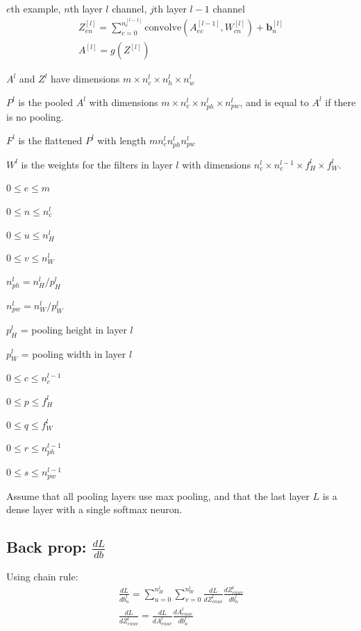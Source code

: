 \documentclass[12pt]{article}
\begin{document}
$e$th example, $n$th layer $l$ channel, $j$th layer $l-1$ channel
\begin{gather*}
    Z^{[l]}_{en} = \sum_{c=0}^{n_c^{[l-1]}}\text{convolve}(A^{[l-1]}_{ec},W^{[l]}_{cn}) + \bm b^{[l]}_n\\
    A^{[l]} = g(Z^{[l]})
\end{gather*}

$A^l$ and $Z^l$ have dimensions $m \times n_c^l \times n_h^l \times n_w^l$

$P^l$ is the pooled $A^l$ with dimensions $m \times n_c^l \times n^l_{ph} \times n^l_{pw}$,
and is equal to $A^l$ if there is no pooling.

$F^l$ is the flattened $P^l$ with length $m n_c^l n_{ph}^l n_{pw}^l$

$W^l$ is the weights for the filters in layer $l$ with dimensions $n_c^l \times n_c^{l-1}
\times f_H^l \times f_W^l$.

$0 \le e \le m$

$0 \le n \le n_c^l$

$0 \le u \le n_H^l$

$0 \le v \le n_W^l$

$n_{ph}^l = n_H^l/p^l_H$

$n_{pw}^l = n_W^l/p^l_W$

$p^l_H$ = pooling height in layer $l$

$p^l_W$ = pooling width in layer $l$

$0 \le c \le n_c^{l-1}$

$0 \le p \le f_H^l$

$0 \le q \le f_W^l$

$0 \le r \le n^{l-1}_{ph}$

$0 \le s \le n^{l-1}_{pw}$

Assume that all pooling layers use max pooling, and that the last layer $L$ is a dense layer with
a single softmax neuron.

\subsection{Back prop: $\frac{dL}{db}$}

Using chain rule:
\begin{gather*}
    \frac{dL}{db^l_n} = \sum_{u=0}^{n_H^l} \sum_{v=0}^{n_W^l}
                        \frac{dL}{dZ^l_{enuv}} \frac{dZ^l_{enuv}}{db^l_n}\\
    \frac{dL}{dZ^l_{enuv}} = \frac{dL}{dA^l_{enuv}} \frac{dA^l_{enuv}}{db^l_n}
\end{gather*}
\end{document}

